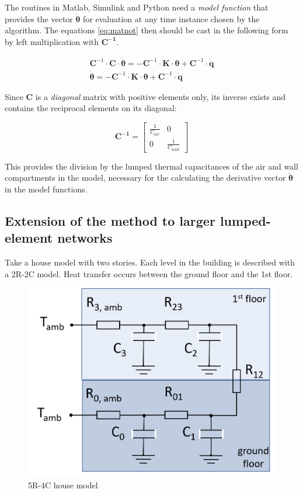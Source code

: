 The routines in Matlab, Simulink and Python need a \emph{model function} that provides the vector $\boldsymbol{\dot{\theta}}$ for evaluation at any time instance chosen by the algorithm. The equations \eqref{eq:matnot} then should be cast in the following form by left multiplication with $\mathbf{C^{-1}}$.

\begin{subequations}
	\label{eq:matnot_ivp}
	\begin{align}
		\mathbf{C}^{-1} \cdot \mathbf{C} \cdot \boldsymbol{\dot{\theta}} = - \mathbf{C}^{-1} \cdot \mathbf{K} \cdot \boldsymbol{\theta} + \mathbf{C}^{-1} \cdot \mathbf{\dot{q}} \\ 
        \boldsymbol{\dot{\theta}} = - \mathbf{C}^{-1} \cdot \mathbf{K} \cdot \boldsymbol{\theta} + \mathbf{C}^{-1} \cdot \mathbf{\dot{q}}
	\end{align}
\end{subequations}

Since $\mathbf{C}$ is a \emph{diagonal} matrix with positive elements only, its inverse exists and contains the reciprocal elements on its diagonal:

\begin{equation}
	\mathbf{C^{-1}} =
	\begin{bmatrix}
		\frac{1}{C_{air}} & 0 \\
		0 &  \frac{1}{C_{wall}}
	\end{bmatrix}
\end{equation}

This provides the division by the lumped thermal capacitances of the air and wall compartments in the model, necessary for the calculating the derivative vector $\boldsymbol{\dot{\theta}}$ in the model functions. 

\subsection{Extension of the method to larger lumped-element networks}

Take a house model with two stories. Each level in the building is described with a 2R-2C model. Heat transfer occurs between the ground floor and the 1st floor.

\begin{figure}[H]
	\centering
	\includegraphics[width=0.6\columnwidth]{Figures/5R4C.png}
	\caption[Short title]{5R-4C house model}
	\label{fig:elec4R5C}
\end{figure}

